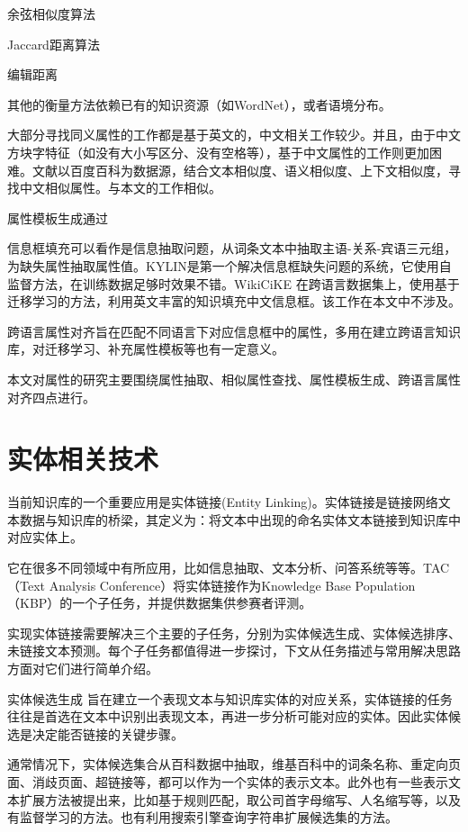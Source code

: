 余弦相似度算法

Jaccard距离算法

编辑距离

其他的衡量方法依赖已有的知识资源（如WordNet）\cite{yang2005measuring}，或者语境分布\cite{pantel2009web}。

大部分寻找同义属性的工作都是基于英文的，中文相关工作较少。并且，由于中文方块字特征（如没有大小写区分、没有空格等），基于中文属性的工作则更加困难。文献\cite{liu2014extracting}以百度百科为数据源，结合文本相似度、语义相似度、上下文相似度，寻找中文相似属性。与本文的工作相似。

{\heiti 属性模板生成}通过

{\heiti 信息框填充}可以看作是信息抽取问题，从词条文本中抽取主语-关系-宾语三元组，为缺失属性抽取属性值。KYLIN\cite{wu2007autonomously}是第一个解决信息框缺失问题的系统，它使用自监督方法，在训练数据足够时效果不错。WikiCiKE\cite{wang2013transfer} 在跨语言数据集上，使用基于迁移学习的方法，利用英文丰富的知识填充中文信息框。该工作在本文中不涉及。

{\heiti 跨语言属性对齐}旨在匹配不同语言下对应信息框中的属性，多用在建立跨语言知识库，对迁移学习、补充属性模板等也有一定意义。

本文对属性的研究主要围绕属性抽取、相似属性查找、属性模板生成、跨语言属性对齐四点进行。


\section{实体相关技术}
\label{sec:entity-research}

当前知识库的一个重要应用是实体链接(Entity Linking)。实体链接是链接网络文本数据与知识库的桥梁，其定义为：将文本中出现的命名实体文本链接到知识库中对应实体上。

它在很多不同领域中有所应用，比如信息抽取\cite{lin2012entity,nakashole2012patty}、文本分析\cite{gattani2013entity}、问答系统\cite{gattani2013entity,welty2012comparison}等等。TAC（Text Analysis Conference）将实体链接作为Knowledge Base Population（KBP）的一个子任务，并提供数据集供参赛者评测。

实现实体链接需要解决三个主要的子任务，分别为实体候选生成、实体候选排序、未链接文本预测。每个子任务都值得进一步探讨，下文从任务描述与常用解决思路方面对它们进行简单介绍。

{\heiti 实体候选生成} 旨在建立一个表现文本与知识库实体的对应关系，实体链接的任务往往是首选在文本中识别出表现文本，再进一步分析可能对应的实体。因此实体候选是决定能否链接的关键步骤。

通常情况下，实体候选集合从百科数据中抽取\cite{bunescu2006using,shen2012linden,shen2013linking}，维基百科中的词条名称、重定向页面、消歧页面、超链接等，都可以作为一个实体的表示文本。此外也有一些表示文本扩展方法被提出来，比如基于规则匹配\cite{han2009nlpr_kbp,lehmann2010lcc}，取公司首字母缩写、人名缩写等，以及有监督学习的方法\cite{zhang2011entity}。也有利用搜索引擎查询字符串扩展候选集的方法\cite{dredze2010entity, monahan2011cross}。

